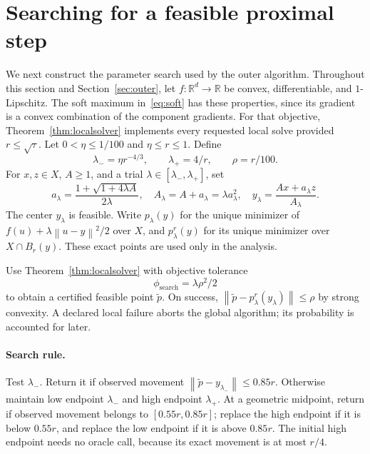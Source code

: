 \documentclass[11pt,a4paper]{article}
\theoremstyle{definition}\newtheorem{definition}[theorem]{Definition}
\theoremstyle{remark}\newtheorem{remark}[theorem]{Remark}
\newcommand{\R}{\mathbb R}
\newcommand{\norm}[1]{\left\|#1\right\|}
\begin{document}
\section{Searching for a feasible proximal step}\label{sec:search}
We next construct the parameter search used by the outer algorithm.
Throughout this section and Section~\ref{sec:outer}, let
$f:\R^d\to\R$ be convex, differentiable, and $1$-Lipschitz.
The soft maximum in~\eqref{eq:soft} has these properties, since its
gradient is a convex combination of the component gradients. For that
objective, Theorem~\ref{thm:localsolver} implements every requested local
solve provided $r\le\sqrt\tau$. Let $0<\eta\le1/100$ and $\eta\le r\le1$.
Define
\begin{equation}\label{eq:lambdas}
 \lambda_- =\eta r^{-4/3},\qquad \lambda_+=4/r,\qquad \rho=r/100.
\end{equation}
For $x,z\in X$, $A\ge1$, and a trial $\lambda\in[\lambda_-,\lambda_+]$, set
\begin{equation}\label{eq:outerweights}
 a_\lambda=\frac{1+\sqrt{1+4\lambda A}}{2\lambda},\quad
 A_\lambda=A+a_\lambda=\lambda a_\lambda^2,\quad
 y_\lambda=\frac{Ax+a_\lambda z}{A_\lambda}.
\end{equation}
The center $y_\lambda$ is feasible. Write $p_\lambda(y)$ for the unique minimizer of
$f(u)+\lambda\norm{u-y}^2/2$ over $X$, and $p^r_\lambda(y)$ for its
unique minimizer over $X\cap B_r(y)$. These exact points are used only
in the analysis.

Use Theorem~\ref{thm:localsolver} with objective tolerance
\begin{equation}\label{eq:searchtol}
 \phi_{\mathrm{search}}=\lambda\rho^2/2
\end{equation}
to obtain a certified feasible point $\tilde p$. On success,
$\norm{\tilde p-p^r_\lambda(y_\lambda)}\le\rho$ by strong convexity. A declared local failure aborts the global algorithm; its probability is accounted for later.

\paragraph{Search rule.}
Test $\lambda_-$. Return it if observed movement $\norm{\tilde p-y_{\lambda_-}}\le0.85r$. Otherwise maintain low endpoint $\lambda_-$ and high endpoint $\lambda_+$. At a geometric midpoint, return if observed movement belongs to $[0.55r,0.85r]$; replace the high endpoint if it is below $0.55r$, and replace the low endpoint if it is above $0.85r$. The initial high endpoint needs no oracle call, because its exact movement is at most $r/4$.
\end{document}
